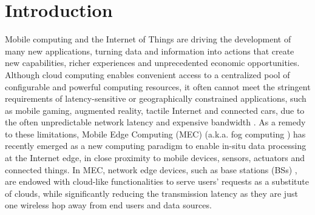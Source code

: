 \documentclass[12pt, draftclsnofoot, letterpaper, onecolumn]{IEEEtran}
\begin{document}




%
\IEEEpeerreviewmaketitle
\section{Introduction}

Mobile computing and the Internet of Things are driving the development of many new
applications, turning data and information into actions that create new capabilities, richer experiences and unprecedented economic opportunities. Although cloud computing enables convenient access to a centralized pool of configurable and powerful computing resources, it often cannot meet the stringent requirements of latency-sensitive or geographically constrained applications, such as mobile gaming, augmented reality, tactile Internet and connected cars, due to the often unpredictable network latency and expensive bandwidth \cite{shi2016edge,mao2017mobile}. As a remedy to these limitations, Mobile Edge Computing (MEC) \cite{patel2014mobile} (a.k.a. fog computing \cite{chiang2016fog}) has recently emerged as a new computing paradigm to enable in-situ data processing at the Internet edge, in close proximity to mobile devices, sensors, actuators and connected things. In MEC, network edge devices, such as base stations (BSs) \cite{mao2017mobile}, are endowed with cloud-like functionalities to serve users' requests as a substitute of clouds, while significantly reducing the transmission latency as they are just one wireless hop away from end users and data sources.
\end{document}
